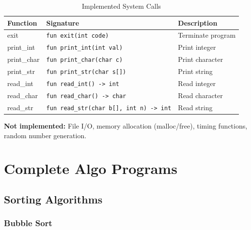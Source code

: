 \documentclass[12pt,a4paper,oneside]{book}
\newcommand{\code}[1]{\texttt{#1}}
\begin{document}
\begin{table}[H]
\centering
\caption{Implemented System Calls}
\small
\begin{tabularx}{\textwidth}{|l|l|X|}
\hline
\textbf{Function} & \textbf{Signature} & \textbf{Description} \\
\hline
exit & \code{fun exit(int code)} & Terminate program \\
\hline
print\_int & \code{fun print\_int(int val)} & Print integer \\
\hline
print\_char & \code{fun print\_char(char c)} & Print character \\
\hline
print\_str & \code{fun print\_str(char s[])} & Print string \\
\hline
read\_int & \code{fun read\_int() -> int} & Read integer \\
\hline
read\_char & \code{fun read\_char() -> char} & Read character \\
\hline
read\_str & \code{fun read\_str(char b[], int n) -> int} & Read string \\
\hline
\end{tabularx}
\end{table}

\textbf{Not implemented:} File I/O, memory allocation (malloc/free), timing functions, random number generation.

\chapter{Complete Algo Programs}

\section{Sorting Algorithms}

\subsection{Bubble Sort}
\end{document}
